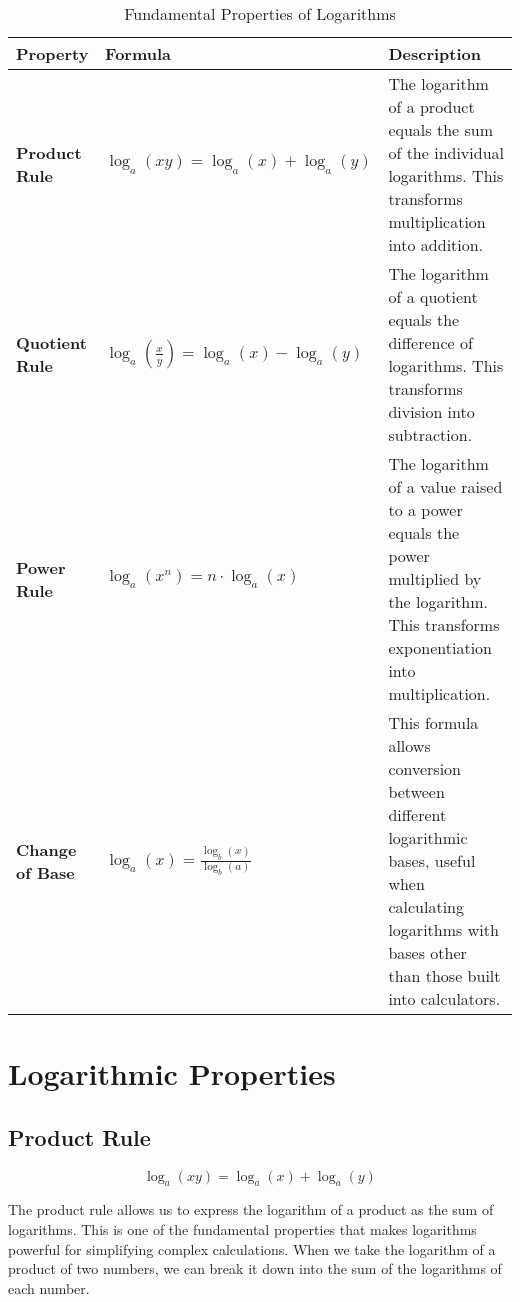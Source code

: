 \documentclass{article}
\begin{document}
\begin{table}[htbp]
\centering
\renewcommand{\arraystretch}{1.5} %
\setlength{\tabcolsep}{15pt} %
\begin{tabular}{|l|p{5cm}|p{6cm}|}
\hline
\textbf{Property} & \textbf{Formula} & \textbf{Description} \\
\hline
\textbf{Product Rule} &
$\log_a(xy) = \log_a(x) + \log_a(y)$ &
The logarithm of a product equals the sum of the individual logarithms. This transforms multiplication into addition. \\
\hline
\textbf{Quotient Rule} &
$\log_a\left(\frac{x}{y}\right) = \log_a(x) - \log_a(y)$ &
The logarithm of a quotient equals the difference of logarithms. This transforms division into subtraction. \\
\hline
\textbf{Power Rule} &
$\log_a(x^n) = n \cdot \log_a(x)$ &
The logarithm of a value raised to a power equals the power multiplied by the logarithm. This transforms exponentiation into multiplication. \\
\hline
\textbf{Change of Base} &
$\log_a(x) = \frac{\log_b(x)}{\log_b(a)}$ &
This formula allows conversion between different logarithmic bases, useful when calculating logarithms with bases other than those built into calculators. \\
\hline
\end{tabular}
\caption{Fundamental Properties of Logarithms}
\label{tab:log_properties}
\end{table}

\section*{Logarithmic Properties}

\subsection*{Product Rule}
\begin{equation}
\log_a(xy) = \log_a(x) + \log_a(y)
\end{equation}

The product rule allows us to express the logarithm of a product as the sum of logarithms. This is one of the fundamental properties that makes logarithms powerful for simplifying complex calculations. When we take the logarithm of a product of two numbers, we can break it down into the sum of the logarithms of each number.
\end{document}
